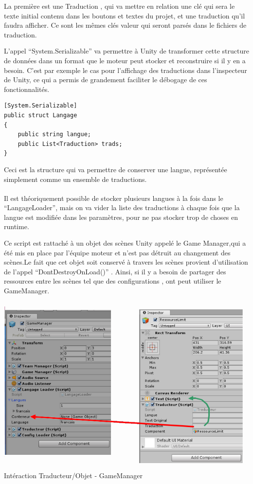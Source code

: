 \documentclass{report}
\begin{document}
La première est une Traduction , qui va mettre en relation une clé qui sera le texte initial contenu dans les boutons et textes du projet, et une traduction qu’il faudra afficher. Ce sont les mêmes clés valeur qui seront parsés dans le fichiers de traduction. 

L’appel “System.Serializable” va permettre à Unity de transformer cette structure de données dans un format que le moteur peut stocker et reconstruire si il y en a besoin. C’est par exemple le cas pour l’affichage des traductions dans l’inspecteur de Unity, ce qui a permis de grandement faciliter le débogage de ces fonctionnalités. 


\begin{lstlisting}[frame=single]
[System.Serializable]
public struct Langage
{
    public string langue;
    public List<Traduction> trads;
}
\end{lstlisting}

Ceci est la structure qui va permettre de conserver une langue, représentée simplement comme un ensemble de traductions.
\paragraph{}
Il est théoriquement possible de stocker plusieurs langues à la fois dans le “LangageLoader”, mais  on va vider la liste des traductions à chaque fois que la langue est modifiée dans les paramètres, pour ne pas stocker trop de choses en runtime.

 Ce script est rattaché à un objet des scènes Unity appelé le Game Manager,qui a été mis en place par l’équipe moteur et n’est pas détruit au changement des scènes.Le fait que cet objet soit conservé à travers les scènes provient d’utilisation de l’appel “DontDestroyOnLoad()” . Ainsi, si il y a besoin de partager des ressources entre les scènes tel que des configurations , ont peut utiliser le GameManager. 

\paragraph{}
\begin{center}
\includegraphics[scale=0.7]{DATA/traducteur2.png}
 {Intéraction Traducteur/Objet - GameManager}
\end{center}
\end{document}
